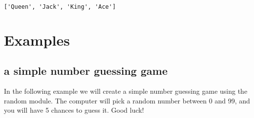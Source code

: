 \documentclass[11pt]{article}
\begin{document}
    \begin{Verbatim}[commandchars=\\\{\}]
['Queen', 'Jack', 'King', 'Ace']
    \end{Verbatim}

    \section{Examples}\label{examples}

\subsection{a simple number guessing game}\label{a-simple-number-guessing-game}

In the following example we will create a simple number guessing game
using the random module. The computer will pick a random number between
0 and 99, and you will have 5 chances to guess it. Good luck!
\end{document}
